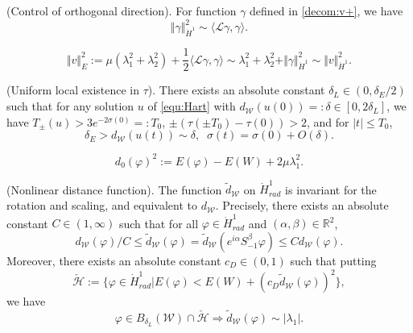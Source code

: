 \documentclass[10pt,a4paper]{amsart}
\newcommand{\R}{\mathbb{R}}
\begin{document}
	\begin{proposition}(Control of orthogonal direction)\label{prop:orth cntl}. For function $\gamma$ defined in \eqref{decom:v+}, we have
		\begin{equation*}
		\Vert \gamma \Vert_{\dot H^1}^2 \sim \langle \mathcal{L}\gamma,\gamma \rangle.
		\end{equation*}
	\end{proposition}

	\begin{equation}\label{quan:equi nor}
	\Vert v \Vert_{E}^2:=\mu (\lambda_{1}^{2}+\lambda_{2}^{2})+\frac{1}{2}\langle \mathcal{L}\gamma,\gamma \rangle \sim \lambda_{1}^{2}+\lambda_{2}^{2}+\Vert \gamma \Vert_{\dot H^1}^2 \sim \Vert v \Vert_{\dot H^1}^2.
	\end{equation}

	\begin{proposition}(Uniform local existence in $\tau$)\label{prop:unif lwp}. There exists an absolute constant $\delta_L\in(0,\delta_{E}/2)$ such that for any solution $u$ of \eqref{equ:Hart} with $d_{\mathcal{W}}(u(0))=:\delta\in\left[ 0,2\delta_L \right]$, we have $T_{\pm}(u)>3e^{-2\sigma(0)}=:T_0$, $\pm\left( \tau(\pm T_0)-\tau(0) \right)>2$, and for $|t|\leq T_0$,
		\begin{equation*}
		\delta_{E}>d_{\mathcal{W}}(u(t))\sim\delta,\;\; \sigma(t)=\sigma(0)+O(\delta).
		\end{equation*}
	\end{proposition}

	\begin{equation}\label{quan:d_0}
	d_0(\varphi)^2:=E(\varphi)-E(W)+2\mu\lambda_{1}^2.
	\end{equation}

	\begin{proposition}(Nonlinear distance function)\label{prop:nlr dist}. The function $\widetilde{d}_{\mathcal{W}}$ on $\dot H^1_{rad}$ is invariant for the rotation and scaling, and equivalent to $d_{\mathcal{W}}$. Precisely, there exists an absolute constant $C\in\left(1,\infty\right)$ such that for all $\varphi\in \dot H^1_{rad}$ and $(\alpha,\beta)\in \R^2$,
		\begin{equation*}
		d_{\mathcal{W}}(\varphi)/C \leq \widetilde{d}_{\mathcal{W}}(\varphi)=\widetilde{d}_{\mathcal{W}}(e^{i\alpha}S_{-1}^{\beta}\varphi) \leq C	d_{\mathcal{W}}(\varphi).
		\end{equation*}
Moreover, there  exists an absolute constant $c_D\in\left(0,1\right)$ such that putting
		\begin{equation*}
		\check{\mathcal{H}}:=\{ \varphi\in \dot H^1_{rad}| E(\varphi)<E(W)+(c_D\widetilde{d}_{\mathcal{W}}(\varphi))^2\},
		\end{equation*}
		we have
		\begin{equation}\label{est:dist eigen}
		\varphi\in B_{\delta_L}(\mathcal{W}) \cap \check{\mathcal{H}} \Longrightarrow \widetilde{d}_{\mathcal{W}}(\varphi) \sim |\lambda_{1}|.
		\end{equation}
	\end{proposition}
\end{document}
